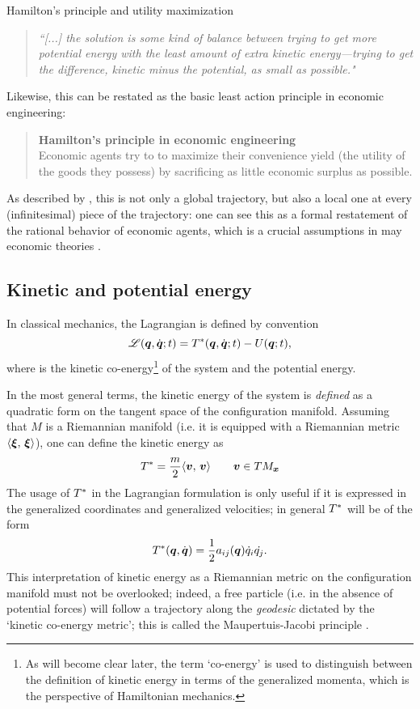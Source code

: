 \begin{econ}{Hamilton's principle and utility maximization}
\begin{quote}
        \emph{``[...] the solution is some kind of balance between trying to get more potential energy with the least amount of extra kinetic energy—trying to get the difference, kinetic minus the potential, as small as possible."}
    \end{quote}
    Likewise, this can be restated as the basic least action principle in economic engineering:
    \begin{quote}
        \textbf{Hamilton's principle in economic engineering}\\ Economic agents try to to maximize their convenience yield (the utility of the goods they possess) by sacrificing as little  economic surplus as possible.
    \end{quote}
    As described by \citet{Feynman2010}, this is not only a global trajectory, but also a local one at every (infinitesimal) piece of the trajectory: one can see this as a formal restatement of the rational behavior of economic agents, which is a crucial assumptions in may economic theories \cite{Mankiw2017}.
\end{econ}

\subsection{Kinetic and potential energy}
In classical mechanics, the Lagrangian is defined by convention
\[\mathscr{L}(\vb*{q},\dot{\vb*{q}}; t) = T^*(\vb*{q},\dot{\vb*{q}}; t) - U(\vb*{q}; t),\] 
where \ecokin is the kinetic co-energy\footnote{As will become clear later, the term `co-energy' is used to distinguish between the definition of kinetic energy in terms of the generalized momenta, which is the perspective of Hamiltonian mechanics.} of the system and \epot the potential energy. 

In the most general terms, the kinetic energy of the system is \emph{defined} as a quadratic form on the tangent space of the configuration manifold. Assuming that $M$ is a Riemannian manifold (i.e. it is equipped with a Riemannian metric $\langle \vb*{\xi},\, \vb*{\xi}\rangle$), one can define the kinetic energy as
\begin{equation}
    T^* = \frac{m}{2}\langle \vb*{v},\, \vb*{v}\rangle\qquad \vb*{v} \in TM_{\vb*{x}}
    \label{eq:ekin_mfld}
\end{equation}
The usage of $T^*$ in the Lagrangian formulation is only useful if it is expressed in the generalized coordinates and generalized velocities; in general $T^*$ will be of the form
$$T^*(\vb*{q}, \dot{\vb*{q}}) = \frac{1}{2}a_{ij}(\vb*{q})\dot{q}_i\dot{q_j}. $$ 
This interpretation of kinetic energy as a Riemannian metric on the configuration manifold must not be overlooked; indeed, a free particle (i.e. in the absence of potential forces) will follow a trajectory along the \emph{geodesic} dictated by the `kinetic co-energy metric'; this is called the Maupertuis-Jacobi principle \cite{Arnold1989}.

